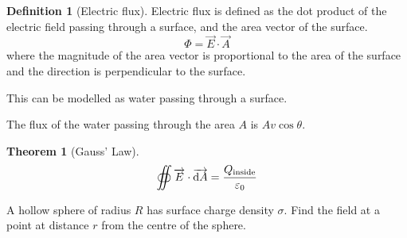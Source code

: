 \documentclass[fleqn, a4paper, 12pt, twoside]{article}
\theoremstyle{definition}
\newtheorem{definition}{Definition}
\theoremstyle{theorem}
\newtheorem{theorem}{Theorem}
\begin{document}
\begin{definition}[Electric flux]
	Electric flux is defined as the dot product of the electric field passing through a surface, and the area vector of the surface.
	\begin{equation*}
		\Phi = \overrightarrow{E} \cdot \overrightarrow{A}
	\end{equation*}
	where the magnitude of the area vector is proportional to the area of the surface and the direction is perpendicular to the surface.
\end{definition}

This can be modelled as water passing through a surface.

\begin{figure}[H]
\end{figure}

The flux of the water passing through the area $A$ is $A v \cos \theta$.

\begin{theorem}[Gauss' Law]
	\begin{equation*}
		\oiint \overrightarrow{E} \cdot \overrightarrow{\dif A} = \dfrac{Q_{\textnormal{inside}}}{\varepsilon_0}
	\end{equation*}
\end{theorem}

\begin{question}
	A hollow sphere of radius $R$ has surface charge density $\sigma$. Find the field at a point at distance $r$ from the centre of the sphere.
\end{question}
\end{document}
